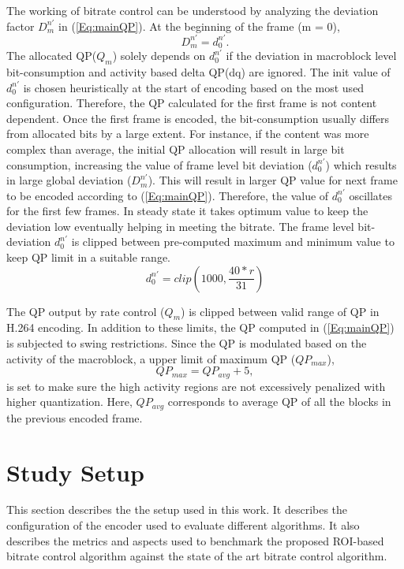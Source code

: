 \documentclass[11pt]{article} %
\begin{document}
The working of bitrate control can be understood by analyzing the deviation factor $D_m^{n'}$ in (\ref{Eq:mainQP}). At the beginning of the frame (m = 0), $$D_m^{n'} = d_0^{n'}.$$ 
The allocated QP($Q_m$) solely depends on $d_0^{n'}$ if the deviation in macroblock level bit-consumption and activity based delta QP(dq) are ignored. The init value of $d_0^{n'}$ is chosen heuristically at the start of encoding based on the most used configuration. Therefore, the QP calculated for the first frame is not content dependent. Once the first frame is encoded, the bit-consumption usually differs from allocated bits by a large extent. For instance, if the content was more complex than average, the initial QP allocation will result in large bit consumption, increasing the value of frame level bit deviation ($d_0^{n'}$) which results in large global deviation ($D_m^{n'}$). This will result in larger QP value for next frame to be encoded according to (\ref{Eq:mainQP}). Therefore, the value of $d_0^{n'}$ oscillates for the first few frames. In steady state it takes optimum value to keep the deviation low eventually helping in meeting the bitrate. The frame level bit-deviation $d_0^{n'}$ is clipped between pre-computed maximum and minimum value to keep QP limit in a suitable range.
\begin{equation}
\label{Eq:DevClip}
d_0^{n'} = clip(1000, \frac{40 * r}{31})
\end{equation}

The QP output by rate control ($Q_m$) is clipped between valid range of QP in H.264 encoding. In addition to these limits, the QP computed in (\ref{Eq:mainQP}) is subjected to swing restrictions. Since the QP is modulated based on the activity of the macroblock, a upper limit of maximum QP ($QP_{max}$),
\begin{equation}
	\label{Eq:QP swing restriction}
	QP_{max} = QP_{avg} + 5,
\end{equation} 
is set to make sure the high activity regions are not excessively penalized with higher quantization. Here, $QP_{avg}$ corresponds to average QP of all the blocks in the previous encoded frame.

\section{Study Setup}
This section describes the the setup used in this work. It describes the configuration of the encoder used to evaluate different algorithms. It also describes the metrics and aspects used to benchmark the proposed ROI-based bitrate control algorithm against the state of the art bitrate control algorithm.
\end{document}
